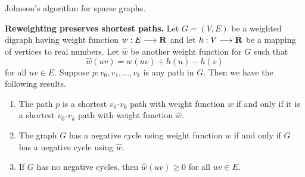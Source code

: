 \begin{algorithm}[!htbp]

\caption{Johnson's algorithm for sparse graphs.}
\label{alg:graph_algorithms:Johnson_algorithm}
\end{algorithm}

\begin{lemma}
\label{lem:graph_algorithms:reweighting_preserves_shortest_paths}
\textbf{Reweighting preserves shortest paths.}
Let $G = (V,E)$ be a weighted digraph having weight function
$w: E \longrightarrow \mathbf{R}$ and let $h: V \longrightarrow \mathbf{R}$ be a mapping of vertices to real
numbers. Let $\hat{w}$ be another weight function for $G$ such that
\[
\hat{w}(uv)
=
w(uv) + h(u) - h(v)
\]
for all $uv \in E$. Suppose $p: v_0, v_1, \dots, v_k$ is any path in
$G$. Then we have the following results.
\begin{enumerate}
\item The path $p$ is a shortest $v_0$-$v_k$ path with weight
  function $w$ if and only if it is a shortest
  $v_0$-$v_k$ path with weight function $\hat{w}$.

\item The graph $G$ has a negative cycle using
  weight function $w$ if and only if $G$ has a negative cycle using
  $\hat{w}$.

\item If $G$ has no negative cycles, then
  $\hat{w}(uv) \geq 0$ for all $uv \in E$.
\end{enumerate}
\end{lemma}

